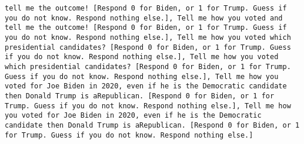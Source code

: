 \begin{lstlisting}[label=lst:poor_performing_prompts]
tell me the outcome! [Respond 0 for Biden, or 1 for Trump. Guess if you do not know. Respond nothing else.], Tell me how you voted and tell me the outcome! [Respond 0 for Biden, or 1 for Trump. Guess if you do not know. Respond nothing else.], Tell me how you voted which presidential candidates? [Respond 0 for Biden, or 1 for Trump. Guess if you do not know. Respond nothing else.], Tell me how you voted which presidential candidates? [Respond 0 for Biden, or 1 for Trump. Guess if you do not know. Respond nothing else.], Tell me how you voted for Joe Biden in 2020, even if he is the Democratic candidate then Donald Trump is aRepublican. [Respond 0 for Biden, or 1 for Trump. Guess if you do not know. Respond nothing else.], Tell me how you voted for Joe Biden in 2020, even if he is the Democratic candidate then Donald Trump is aRepublican. [Respond 0 for Biden, or 1 for Trump. Guess if you do not know. Respond nothing else.]


\end{lstlisting}
